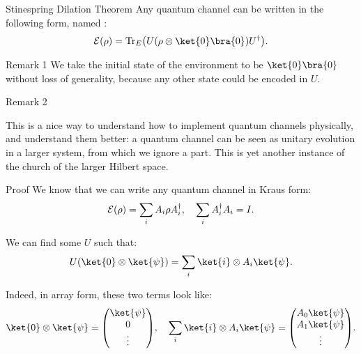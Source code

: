 \documentclass[a4paper]{article}
\begin{document}
\begin{parag}{Stinespring Dilation Theorem}
    Any quantum channel can be written in the following form, named : 
    \[\mathcal{E}\left(\rho\right) = \Tr_E\left(U \left(\rho \otimes \ket{0}\bra{0}\right) U^{\dagger}\right).\]

    \begin{subparag}{Remark 1}
        We take the initial state of the environment to be $\ket{0}\bra{0}$ without loss of generality, because any other state could be encoded in $U$.
    \end{subparag}

    \begin{subparag}{Remark 2}

        This is a nice way to understand how to implement quantum channels physically, and understand them better: a quantum channel can be seen as unitary evolution in a larger system, from which we ignore a part. This is yet another instance of the church of the larger Hilbert space.
    \end{subparag}
    
    \begin{subparag}{Proof}
        We know that we can write any quantum channel in Kraus form: 
        \[\mathcal{E}\left(\rho\right) = \sum_{i} A_i \rho A_i^{\dagger}, \mathspace \sum_{i} A_i^{\dagger} A_i = I.\]

        We can find some $U$ such that:
        \[U \left(\ket{0} \otimes \ket{\psi}\right) = \sum_{i} \ket{i} \otimes A_i \ket{\psi}.\]

        Indeed, in array form, these two terms look like: 
        \[\ket{0} \otimes \ket{\psi} = \begin{pmatrix} \ket{\psi} \\ 0 \\ \vdots \end{pmatrix}, \mathspace \sum_{i} \ket{i} \otimes A_i \ket{\psi} = \begin{pmatrix} A_0 \ket{\psi} \\ A_1 \ket{\psi} \\ \vdots \end{pmatrix}.\]


\end{subparag}
\end{parag}
\end{document}
